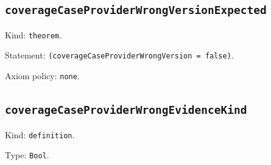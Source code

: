 \documentclass[11pt]{article}
\begin{document}
\subsection*{\texttt{coverageCaseProviderWrongVersionExpected}}
\noindent Kind: \texttt{theorem}.\par
\noindent Statement: \texttt{(coverageCaseProviderWrongVersion = false)}.\par
\noindent Axiom policy: \texttt{none}.\par
\subsection*{\texttt{coverageCaseProviderWrongEvidenceKind}}
\noindent Kind: \texttt{definition}.\par
\noindent Type: \texttt{Bool}.\par
\end{document}
